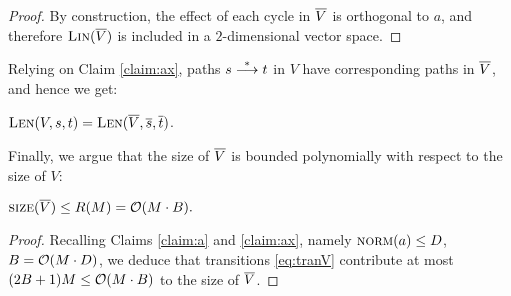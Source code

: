 \begin{proof}
By construction, the effect of each cycle in $\overline{V}$ is orthogonal to $a$, and therefore 
$\textsc{Lin}(\overline{V})$ is included in a $2$-dimensional vector space.
\end{proof}
%
Relying on Claim \ref{claim:ax}, paths $s\stackrel{*}{\longrightarrow} t$ in $V$ have corresponding paths in $\overline{V}$,
and hence we get:
\begin{claim} \label{claim:lenlen}
$\textsc{Len}(V, s, t) = \textsc{Len}(\overline{V}, \overline{s}, \overline{t})$.
\end{claim}
%
%
Finally, we argue that the size of $\overline{V}$ is bounded polynomially with respect to the size of $V$:
%
\begin{claim} \label{claim:sizeVV}
$\textsc{size}(\overline{V}) \leq R(M) = {\cal O}(M\cdot B).$
\end{claim}
%
\begin{proof}
Recalling Claims \ref{claim:a} and \ref{claim:ax}, namely
$\textsc{norm}(a)\leq D$, $B={\cal O}(M\cdot D)$, we deduce that 
transitions \eqref{eq:tranV} contribute at most $(2B+1)M \leq {\cal O}(M\cdot B)$ to the size of $\overline{V}$.
\end{proof}
